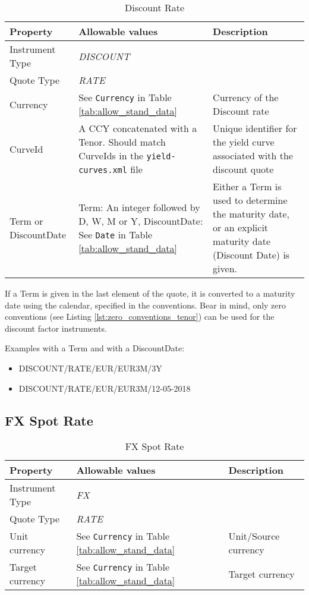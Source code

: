 \begin{table}[H]
\centering
\begin{tabular}{|p{3.3cm}|p{5cm}|p{7cm}|}
  \hline
  {\bf Property} & {\bf Allowable values} & {\bf Description} \\ \hline
  Instrument Type & \emph{DISCOUNT} & \\ \hline
  Quote Type & \emph{RATE} & \\ \hline
  Currency & See \lstinline!Currency! in Table \ref{tab:allow_stand_data} & Currency of the Discount rate\\ \hline
  CurveId& A CCY concatenated with a Tenor. Should match CurveIds in the {\tt yield-curves.xml} file & Unique identifier for the yield curve associated with the discount quote\\ \hline
  Term or DiscountDate & Term: An integer followed by D, W, M or Y, DiscountDate: See \lstinline!Date! in Table \ref{tab:allow_stand_data} & Either a Term is used to determine the maturity date, or an explicit maturity date (Discount Date) is given.\\ \hline
\end{tabular}
  \caption{Discount Rate}
  \label{tab:discount_quote}
\end{table}

If a Term is given in the last element of the quote, it is converted to a maturity date using the calendar, specified in the conventions.
Bear in mind, only zero conventions (see Listing \ref{lst:zero_conventions_tenor}) can be used for the discount factor instruments.

\medskip
Examples with a Term and with a DiscountDate:
\begin{itemize}
\item {DISCOUNT/RATE/EUR/EUR3M/3Y}
\item {DISCOUNT/RATE/EUR/EUR3M/12-05-2018}
\end{itemize}

\subsection{FX Spot Rate}
\label{ss:fx_spot_rate}

\begin{table}[H]
\centering
  \begin{tabular}{|p{3cm}|p{3.5cm}|p{7cm}|}
  \hline
    {\bf Property} & {\bf Allowable values} & {\bf Description}\\ \hline
    Instrument Type & \emph{FX} & \\ \hline
    Quote Type & \emph{RATE} & \\ \hline
    Unit currency & See \lstinline!Currency! in Table \ref{tab:allow_stand_data} & Unit/Source currency\\ \hline
    Target currency & See \lstinline!Currency! in Table \ref{tab:allow_stand_data} & Target currency\\ \hline
  \end{tabular}
  \caption{FX Spot Rate}
  \label{tab:fxspot_quote}
\end{table}

